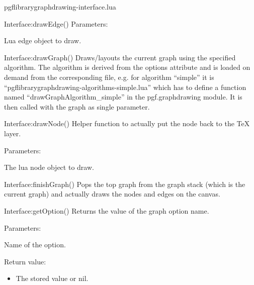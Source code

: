\begin{filedescription}{pgflibrarygraphdrawing-interface.lua}
\begin{luacommand}{{Interface:drawEdge}()}
Parameters:
\begin{parameterdescription}
	\item[\meta{object}] Lua edge object to draw.
\end{parameterdescription}



\end{luacommand}\begin{luacommand}{{Interface:drawGraph}()}
Draws/layouts the current graph using the specified algorithm.  The algorithm is derived from the options attribute and is loaded on demand from the corresponding file, e.g. for algorithm ``simple'' it is ``pgflibrarygraphdrawing-algorithms-simple.lua'' which has to define a function named ``drawGraphAlgorithm\_simple'' in the pgf.graphdrawing module.  It is then called with the graph as single parameter.



\end{luacommand}\begin{luacommand}{{Interface:drawNode}()}
Helper function to actually put the node back to the TeX layer.

Parameters:
\begin{parameterdescription}
	\item[\meta{object}] The lua node object to draw.
\end{parameterdescription}



\end{luacommand}\begin{luacommand}{{Interface:finishGraph}()}
Pops the top graph from the graph stack (which is the current graph) and actually draws the nodes and edges on the canvas.



\end{luacommand}\begin{luacommand}{{Interface:getOption}()}
Returns the value of the graph option name.

Parameters:
\begin{parameterdescription}
	\item[\meta{name}] Name of the option.
\end{parameterdescription}


Return value:
\begin{itemize} \item[] The stored value or nil. \end{itemize}



\end{luacommand}
\end{filedescription}
